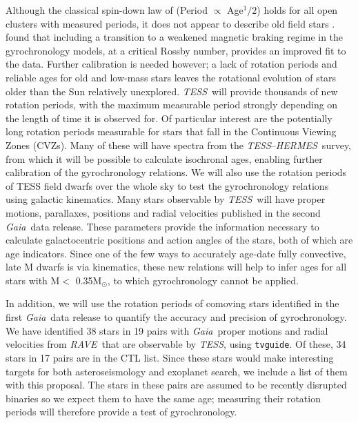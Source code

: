 \documentclass[letterpaper,12pt,preprint]{hack_aastex}
\newcommand{\TESS}{{\it TESS}}
\newcommand{\tess}{{\it TESS}}
\newcommand{\Gaia}{{\it Gaia}}
\newcommand{\RAVE}{{\it RAVE}}
\newcommand{\HERMES}{{\it HERMES}}
\begin{document}
Although the classical spin-down law of \citet{skumanich1972} (Period
$\propto$ Age$^1/2$) holds for all open clusters with measured periods, it does
not appear to describe old field stars \citep{angus2015, van-saders2016}.
\citet{van-saders2016} found that including a transition to a weakened magnetic
braking regime in the gyrochronology models, at a critical Rossby number,
provides an improved fit to the data.
Further calibration is needed however; a lack of rotation periods and reliable
ages for old and low-mass stars leaves the rotational evolution of stars older
than the Sun relatively unexplored.
\TESS\ will provide thousands of new rotation periods, with the maximum
measurable period strongly depending on the length of time it is observed for.
Of particular interest are the potentially long rotation periods measurable
for stars that fall in the Continuous Viewing Zones (CVZs).
Many of these will have spectra from the \TESS --\HERMES\ survey, from which it
will be possible to calculate isochronal ages, enabling further calibration of
the gyrochronology relations.
We will also use the rotation periods of TESS field dwarfs over the whole sky
to test the gyrochronology relations using galactic kinematics.
Many stars observable by \tess\ will have proper motions, parallaxes,
positions and radial velocities published in the second \Gaia\ data release.
These parameters provide the information necessary to calculate galactocentric
positions and action angles of the stars, both of which are age indicators.
Since one of the few ways to accurately age-date fully convective, late M
dwarfs is via kinematics, these new relations will help to infer ages for all
stars with M$<$ 0.35M$_\odot$, to which gyrochronology cannot be applied.

In addition, we will use the rotation periods of comoving stars identified in
the first \Gaia\ data release \citep{oh2016} to quantify the accuracy and
precision of gyrochronology.
We have identified 38 stars in 19 pairs with \Gaia\ proper motions and radial
velocities from \RAVE\ that are observable by \TESS, using {\tt tvguide}.
Of these, 34 stars in 17 pairs are in the CTL list.
Since these stars would make interesting targets for both asteroseismology and
exoplanet search, we include a list of them with this proposal.
The stars in these pairs are assumed to be recently disrupted binaries so we
expect them to have the same age; measuring their rotation periods will
therefore provide a test of gyrochronology.
\end{document}
